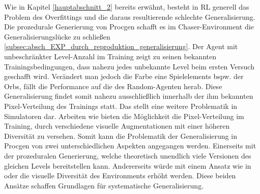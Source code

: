 Wie in Kapitel \ref{hauptabschnitt_2} bereits erwähnt, besteht in RL generell das Problem des Overfittings und die daraus resultierende schlechte Generalisierung. Die prozedurale Generierung von Procgen schafft es im Chaser-Environment die Generalisierungslücke zu schließen \ref{subsec:absch_EXP_durch_reproduktion_generalisierung}. Der Agent mit unbeschränkter Level-Anzahl im Training zeigt zu seinen bekannten Trainingsbedingungen, dass nahezu jedes unbekannte Level beim ersten Versuch geschafft wird. Verändert man jedoch die Farbe eine Spielelements bspw. der Orbs, fällt die Performance auf die des Random-Agenten herab. Diese Generalisierung findet somit nahezu ausschließlich innerhalb der ihm bekannten Pixel-Verteilung des Trainings statt. Das stellt eine weitere Problematik in Simulatoren dar. Arbeiten wie \cite{raileanu2020automatic} bieten die Möglichkeit die Pixel-Verteilung im Training, durch verschiedene visuelle Augmentationen mit einer höheren Diversität zu versehen. Somit kann die Problematik der Generalisierung in Procgen von zwei unterschiedlichen Aspekten angegangen werden. Einerseits mit der prozeduralen Generierung, welche theoretisch unendlich viele Versionen des gleichen Levels bereitstellen kann. Andererseits würde mit einem Ansatz wie in \cite{raileanu2020automatic} oder \cite{zhang2018natural} die visuelle Diversität des Environments erhöht werden. Diese beiden Ansätze schaffen Grundlagen für systematische Generalisierung.


